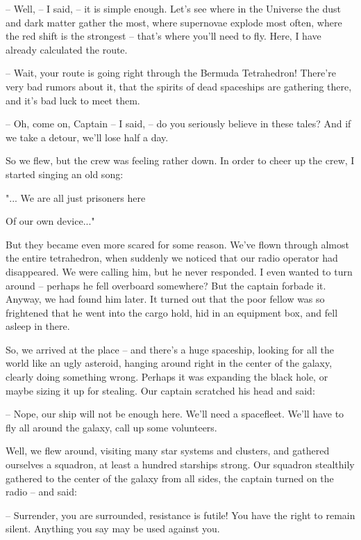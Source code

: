 \documentclass[ebook,twoside,final,openright]{memoir}
\begin{document}
– Well, – I said, – it is simple enough. Let's see where in the Universe the dust and dark matter gather the most, where supernovae explode most often, where the red shift is the strongest – that’s where you’ll need to fly. Here, I have already calculated the route.\par
– Wait, your route is going right through the Bermuda Tetrahedron! There’re very bad rumors about it, that the spirits of dead spaceships are gathering there, and it’s bad luck to meet them.\par
– Oh, come on, Captain – I said, – do you seriously believe in these tales? And if we take a detour, we’ll lose half a day.\par
\par
So we flew, but the crew was feeling rather down. In order to cheer up the crew, I started singing an old song: \par
 "... We are all just prisoners here \par
 Of our own device..." \par
 But they became even more scared for some reason. We’ve flown through almost the entire tetrahedron, when suddenly we noticed that our radio operator had disappeared. We were calling him, but he never responded. I even wanted to turn around – perhaps he fell overboard somewhere? But the captain forbade it. Anyway, we had found him later. It turned out that the poor fellow was so frightened that he went into the cargo hold, hid in an equipment box, and fell asleep in there.\par
\par
So, we arrived at the place – and there’s a huge spaceship, looking for all the world like an ugly asteroid, hanging around right in the center of the galaxy, clearly doing something wrong. Perhaps it was expanding the black hole, or maybe sizing it up for stealing. Our captain scratched his head and said:\par
– Nope, our ship will not be enough here. We’ll need a spacefleet. We'll have to fly all around the galaxy, call up some volunteers.\par
Well, we flew around, visiting many star systems and clusters, and gathered ourselves a squadron, at least a hundred starships strong. Our squadron stealthily gathered to the center of the galaxy from all sides, the captain turned on the radio – and said:\par
– Surrender, you are surrounded, resistance is futile! You have the right to remain silent. Anything you say may be used against you.\par
\end{document}
